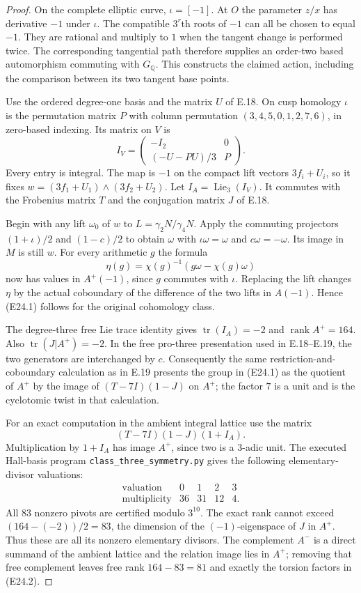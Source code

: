 \begin{proof}
On the complete elliptic curve, $\iota=[-1]$.
At $O$ the parameter $z/x$ has derivative $-1$
under $\iota$. The compatible $3^r$th roots of $-1$
can all be chosen to equal $-1$. They are rational
and multiply to $1$ when the tangent change is
performed twice. The corresponding tangential
path therefore supplies an order-two based
automorphism commuting with $G_{\mathbb Q}$.
This constructs the claimed action, including the
comparison between its two tangent base points.

Use the ordered degree-one basis and the matrix $U$
of E.18. On cusp homology $\iota$ is the permutation
matrix $P$ with column permutation
$(3,4,5,0,1,2,7,6)$, in zero-based indexing. Its
matrix on $V$ is
\[
 I_V=\begin{pmatrix}
 -I_2&0\\(-U-PU)/3&P
 \end{pmatrix}.\tag{E24.3}
\]
Every entry is integral. The map is $-1$ on the
compact lift vectors $3f_i+U_i$, so it fixes
$w=(3f_1+U_1)\wedge(3f_2+U_2)$.
Let $I_A=\operatorname{Lie}_3(I_V)$.
It commutes with the Frobenius matrix $T$ and
the conjugation matrix $J$ of E.18.

Begin with any lift $\omega_0$ of $w$ to
$L=\gamma_2N/\gamma_4N$. Apply the commuting
projectors $(1+\iota)/2$ and $(1-c)/2$ to obtain
$\omega$ with $\iota\omega=\omega$ and
$c\omega=-\omega$. Its image in $M$ is still $w$.
For every arithmetic $g$ the formula
\[
 \eta(g)=\chi(g)^{-1}(g\omega-\chi(g)\omega)
\]
now has values in $A^+(-1)$, since $g$ commutes
with $\iota$. Replacing the lift changes $\eta$
by the actual coboundary of the difference of the
two lifts in $A(-1)$. Hence (E24.1) follows for
the original cohomology class.

The degree-three free Lie trace identity gives
$\operatorname{tr}(I_A)=-2$ and
$\operatorname{rank}A^+=164$. Also
$\operatorname{tr}(J|A^+)=-2$. In the free
pro-three presentation used in E.18--E.19, the
two generators are interchanged by $c$.
Consequently the same restriction-and-coboundary
calculation as in E.19 presents the group in
(E24.1) as the quotient of $A^+$ by the image of
$(T-7I)(1-J)$ on $A^+$; the factor $7$ is a unit
and is the cyclotomic twist in that calculation.

For an exact computation in the ambient integral
lattice use the matrix
\[
             (T-7I)(1-J)(1+I_A).
\]
Multiplication by $1+I_A$ has image $A^+$, since
two is a $3$-adic unit. The executed Hall-basis
program \texttt{class\_three\_symmetry.py} gives
the following elementary-divisor valuations:
\[
\begin{array}{c|rrrr}
\text{valuation}&0&1&2&3\\\hline
\text{multiplicity}&36&31&12&4.
\end{array}
\]
All 83 nonzero pivots are certified modulo $3^{10}$.
The exact rank cannot exceed
$(164-(-2))/2=83$, the dimension of the
$(-1)$-eigenspace of $J$ in $A^+$.
Thus these are all its nonzero elementary divisors.
The complement $A^-$ is a direct summand of the
ambient lattice and the relation image lies in
$A^+$; removing that free complement leaves
free rank $164-83=81$ and exactly the torsion
factors in (E24.2).


\end{proof}
